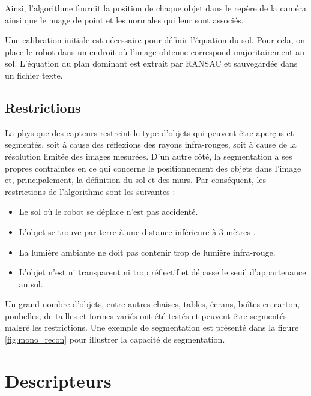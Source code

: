 Ainsi, l'algorithme fournit la position de chaque objet dans le repère de la caméra ainsi que le nuage de point et les normales qui leur sont associés.

Une calibration initiale est nécessaire pour définir l'équation du sol. Pour cela, on place le robot dans un endroit où l'image obtenue correspond majoritairement au sol. L’équation du plan dominant est extrait par RANSAC et sauvegardée dans un fichier texte. %


\subsection{Restrictions} 
La physique des capteurs restreint le type d'objets qui peuvent être aperçus et segmentés, soit à cause des réflexions des rayons infra-rouges, soit à cause de la
résolution limitée des images mesurées. D'un autre côté, la segmentation a ses propres contraintes en ce qui concerne le positionnement des objets dans l'image et, principalement, la définition du sol et des murs. Par conséquent, les restrictions de l'algorithme sont les suivantes :

\begin{itemize}
\item Le sol où le robot se déplace n'est pas accidenté.
\item L'objet se trouve par terre à une distance inférieure à 3 mètres .
\item La lumière ambiante ne doit pas contenir trop de lumière infra-rouge.
\item L'objet n'est ni transparent ni trop réflectif et dépasse le seuil d'appartenance au sol.
\end{itemize} 

Un grand nombre d'objets, entre autres chaises, tables, écrans, boîtes en carton, poubelles, de tailles et formes variés ont été testés et peuvent être segmentés malgré les restrictions. Une exemple de segmentation est présenté dans la figure \ref{fig:mono_recon} pour illustrer la capacité de segmentation. 

\section{Descripteurs}


